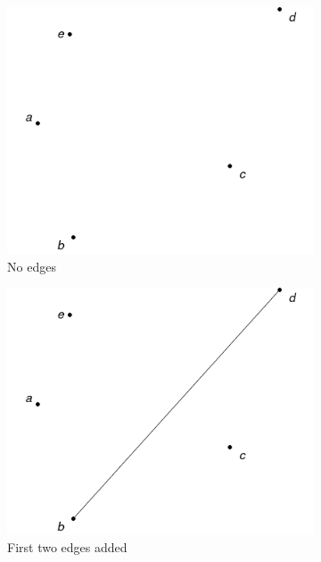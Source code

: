 \begin{figure}
	\centering
	\begin{subfigure}[b]{0.3\textwidth}
		\includegraphics[width=\textwidth]{images/extra_1}
		\caption{No edges}
	\end{subfigure}
	\hfill
	\begin{subfigure}[b]{0.3\textwidth}
		\includegraphics[width=\textwidth]{images/extra_2}
		\caption{First two edges added}
	\end{subfigure}
	\hfill
	\begin{subfigure}[b]{0.3\textwidth}

\end{subfigure}
\end{figure}
